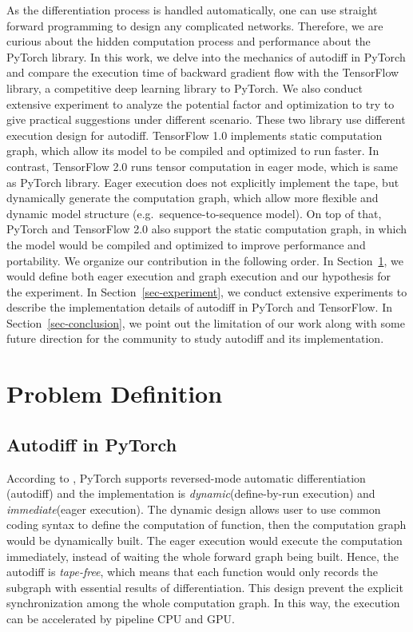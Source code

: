 \documentclass[12pt,twocolumn,letterpaper]{extarticle}
\begin{document}
As the differentiation process is handled automatically, one can use straight forward programming to design any complicated networks. Therefore, we are curious about the hidden computation process and performance about the PyTorch library. In this work, we delve into the mechanics of autodiff in PyTorch and compare the execution time of backward gradient flow with the TensorFlow library, a competitive deep learning library to PyTorch. We also conduct extensive experiment to analyze the potential factor and optimization to try to give practical suggestions under different scenario. These two library use different execution design for autodiff. TensorFlow 1.0 implements static computation graph, which allow its model to be compiled and optimized to run faster. In contrast, TensorFlow 2.0 runs tensor computation in eager mode, which is same as PyTorch library. Eager execution does not explicitly implement the tape, but dynamically generate the computation graph, which allow more flexible and dynamic model structure (e.g.\ sequence-to-sequence model). On top of that, PyTorch and TensorFlow 2.0 also support the static computation graph, in which the model would be compiled and optimized to improve performance and portability. We organize our contribution in the following order. In Section~\ref{sec:problem-definition}, we would define both eager execution and graph execution and our hypothesis for the experiment. In Section~\ref{sec-experiment}, we conduct extensive experiments to describe the implementation details of autodiff in PyTorch and TensorFlow. In Section~\ref{sec-conclusion}, we point out the limitation of our work along with some future direction for the community to study autodiff and its implementation.

\section{Problem Definition} \label{sec:problem-definition}

\subsection{Autodiff in PyTorch}

According to \cite{paszke2017automatic}, PyTorch supports reversed-mode automatic differentiation (autodiff) and the implementation is \emph{dynamic}\;(define-by-run execution) and \emph{immediate}\;(eager execution). The dynamic design allows user to use common coding syntax to define the computation of function, then the computation graph would be dynamically built. The eager execution would execute the computation immediately, instead of waiting the whole forward graph being built. Hence, the autodiff is \emph{tape-free}, which means that each function would only records the subgraph with essential results of differentiation. This design prevent the explicit synchronization among the whole computation graph. In this way, the execution can be accelerated by pipeline CPU and GPU.
\end{document}
